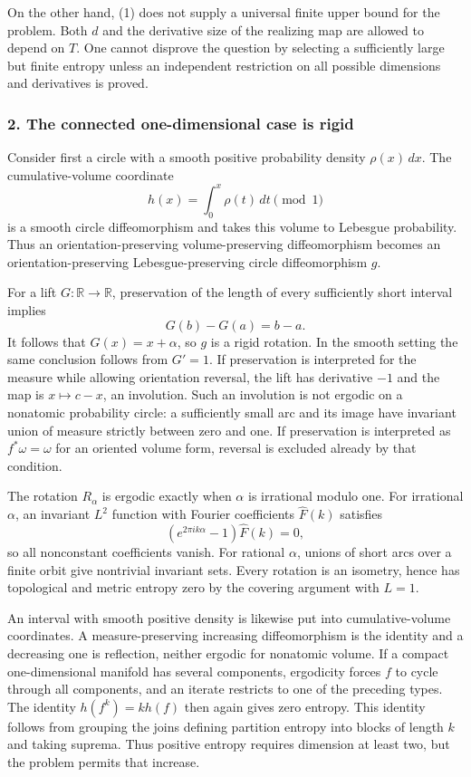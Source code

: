 \documentclass[11pt]{article}
\begin{document}
On the other hand, (1) does not supply a universal finite upper bound for the problem. Both $d$ and the derivative size of the realizing map are allowed to depend on $T$. One cannot disprove the question by selecting a sufficiently large but finite entropy unless an independent restriction on all possible dimensions and derivatives is proved.

\subsubsection{2. The connected one-dimensional case is rigid}
Consider first a circle with a smooth positive probability density $\rho(x)\,dx$. The cumulative-volume coordinate
\[
 h(x)=\int_0^x\rho(t)\,dt\pmod1
\]
is a smooth circle diffeomorphism and takes this volume to Lebesgue probability. Thus an orientation-preserving volume-preserving diffeomorphism becomes an orientation-preserving Lebesgue-preserving circle diffeomorphism $g$.

For a lift $G:\mathbb R\to\mathbb R$, preservation of the length of every sufficiently short interval implies
\[
 G(b)-G(a)=b-a.
\]
It follows that $G(x)=x+\alpha$, so $g$ is a rigid rotation. In the smooth setting the same conclusion follows from $G'=1$. If preservation is interpreted for the measure while allowing orientation reversal, the lift has derivative $-1$ and the map is $x\mapsto c-x$, an involution. Such an involution is not ergodic on a nonatomic probability circle: a sufficiently small arc and its image have invariant union of measure strictly between zero and one. If preservation is interpreted as $f^*\omega=\omega$ for an oriented volume form, reversal is excluded already by that condition.

The rotation $R_\alpha$ is ergodic exactly when $\alpha$ is irrational modulo one. For irrational $\alpha$, an invariant $L^2$ function with Fourier coefficients $\widehat F(k)$ satisfies
\[
 (e^{2\pi i k\alpha}-1)\widehat F(k)=0,
\]
so all nonconstant coefficients vanish. For rational $\alpha$, unions of short arcs over a finite orbit give nontrivial invariant sets. Every rotation is an isometry, hence has topological and metric entropy zero by the covering argument with $L=1$.

An interval with smooth positive density is likewise put into cumulative-volume coordinates. A measure-preserving increasing diffeomorphism is the identity and a decreasing one is reflection, neither ergodic for nonatomic volume. If a compact one-dimensional manifold has several components, ergodicity forces $f$ to cycle through all components, and an iterate restricts to one of the preceding types. The identity $h(f^k)=k h(f)$ then again gives zero entropy. This identity follows from grouping the joins defining partition entropy into blocks of length $k$ and taking suprema. Thus positive entropy requires dimension at least two, but the problem permits that increase.
\end{document}
